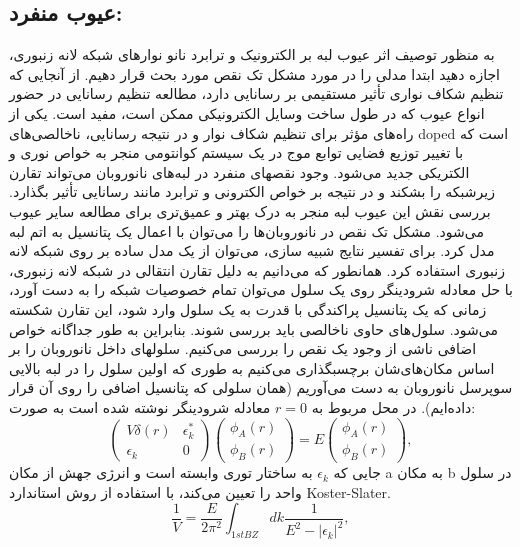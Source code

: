 \subsection{عیوب منفرد:} 
به منظور توصیف اثر عیوب لبه بر الکترونیک و ترابرد نانو نوارهای شبکه لانه زنبوری، اجازه دهید ابتدا مدلی را در مورد مشکل تک نقص مورد بحث قرار دهیم. از آنجایی که تنظیم \gls{شکاف نواری} تأثیر مستقیمی‌‌ بر رسانایی دارد، مطالعه تنظیم رسانایی در حضور انواع عیوب که در طول ساخت وسایل الکترونیکی ممکن است، مفید است. یکی از راه‌های مؤثر برای تنظیم شکاف نوار و در نتیجه رسانایی، ناخالصی‌های \gls{doped} است که با تغییر توزیع فضایی توابع موج در یک سیستم کوانتو‌‌می‌‌ منجر به خواص نوری و الکتریکی جدید ‌می‌شود. وجود نقصهای منفرد در لبه‌های نانوروبان ‌می‌‌تواند تقارن زیرشبکه را بشکند و در نتیجه بر خواص الکترونی و ترابرد مانند رسانایی تأثیر بگذارد. بررسی نقش این عیوب لبه منجر به درک بهتر و عمیق‌تری برای مطالعه سایر عیوب ‌‌می‌‌شود. مشکل تک نقص در نانوروبان‌ها را ‌‌می‌‌توان با اعمال یک پتانسیل به اتم لبه مدل کرد. برای تفسیر نتایج شبیه سازی، ‌‌می‌‌توان از یک مدل ساده بر روی شبکه لانه زنبوری استفاده کرد. همانطور که ‌‌می‌‌دانیم به دلیل تقارن انتقالی در شبکه لانه زنبوری، با حل معادله شرودینگر روی یک سلول ‌‌می‌‌توان تمام خصوصیات شبکه را به دست آورد، زمانی که یک پتانسیل پراکندگی با قدرت  به یک سلول وارد شود، این تقارن شکسته ‌‌می‌‌شود. سلول‌های حاوی ناخالصی باید بررسی شوند. بنابراین به طور جداگانه خواص اضافی ناشی از وجود یک نقص را بررسی ‌می‌‌کنیم. سلولهای داخل نانوروبان را بر اساس مکان‌های‌شان برچسبگذاری ‌می‌‌کنیم به طوری که اولین سلول را در لبه بالایی سوپرسل نانوروبان به دست ‌می‌آوریم (همان سلولی که پتانسیل اضافی را روی آن قرار داده‌ایم). در محل مربوط به $r = 0$ معادله شرودینگر نوشته شده است به صورت:
\begin{equation}
  \left(
  \begin{array}{cc}
    V\delta(r)&\epsilon^{*}_{k}\\
    \epsilon_k & 0
  \end{array}
  \right)
  \left(
  \begin{array}{c}
    \phi_{A}(r)\\
    \phi_{B}(r)
  \end{array}
  \right)
  =E
  \left(
  \begin{array}{c}
    \phi_{A}(r)\\
    \phi_{B}(r)
  \end{array}
  \right),
\end{equation}
جایی که $\epsilon_k$ به ساختار توری وابسته است و انرژی جهش از مکان a به مکان b در سلول واحد را تعیین ‌‌می‌‌کند، با استفاده از روش استاندارد \gls{Koster-Slater}\cite{Koster1954Wave}.
\begin{equation}
  \frac{1}{V}=\frac{E}{2\pi^2}\int_{1st BZ}dk\frac{1}{E^2-|\epsilon_k|^2},
  \label{virtual}
\end{equation}

